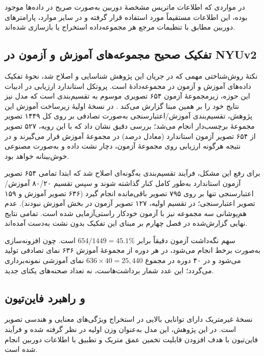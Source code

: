 در مواردی که اطلاعات ماتریس مشخصهٔ دوربین به‌صورت صریح در داده‌ها موجود بوده، این اطلاعات مستقیماً مورد استفاده قرار گرفته و در سایر موارد، پارامترهای دوربین مطابق با تنظیمات مرجع هر مجموعه‌داده استخراج یا بازسازی شده‌اند.

\subsection{تفکیک صحیح مجموعه‌های آموزش و آزمون در NYUv2}

نکتهٔ روش‌شناختی مهمی که در جریان این پژوهش شناسایی و اصلاح شد، نحوهٔ تفکیک داده‌های آموزش و آزمون در مجموعه‌دادهٔ  است. پروتکل استاندارد ارزیابی در ادبیات این حوزه، زیرمجموعهٔ آزمون ۶۵۴ تصویری موسوم به تقسیم‌بندی  است \cite{Eigen2014Depth} که مدل  نیز نتایج خود را بر همین مبنا گزارش می‌کند \cite{DepthAnythingV2}. در نسخهٔ اولیهٔ زیرساخت آموزش این پژوهش، تقسیم‌بندی آموزش/اعتبارسنجی به‌صورت تصادفی بر روی کل ۱۴۴۹ تصویر مجموعهٔ برچسب‌دار انجام می‌شد؛ بررسی دقیق نشان داد که با این رویه، ۵۲۷ تصویر از ۶۵۴ تصویر آزمون استاندارد (معادل  درصد) در مجموعهٔ آموزش قرار می‌گیرند و در نتیجه هرگونه ارزیابی روی مجموعهٔ آزمون، دچار نشت داده و به‌صورت مصنوعی خوش‌بینانه خواهد بود.

برای رفع این مشکل، فرآیند تقسیم‌بندی به‌گونه‌ای اصلاح شد که ابتدا تمامی ۶۵۴ تصویر آزمون استاندارد به‌طور کامل کنار گذاشته شوند و سپس تقسیم ۸۰/۲۰ آموزش/اعتبارسنجی تنها بر روی ۷۹۵ تصویر باقی‌مانده انجام گیرد (۶۳۶ تصویر آموزش و ۱۵۹ تصویر اعتبارسنجی؛ در تقسیم اولیه، ۱۲۷ تصویر آزمون در بخش آموزش نبودند). عدم هم‌پوشانی سه مجموعه نیز با آزمون خودکار راستی‌آزمایی شده است. تمامی نتایج نهایی گزارش‌شده در فصل چهارم بر مبنای این تفکیک بدون نشت به‌دست آمده‌اند.

سهم نگه‌داشت آزمون دقیقاً برابر \(654/1449=45.1\%\) است. چون افزونه‌سازی به‌صورت برخط انجام می‌شود، در هر دوره از مجموعهٔ آموزش ۶۳۶ نمای تصادفی تولید می‌شود و در ۴۰ دوره در مجموع \(636\times40=25{,}440\) نمای آموزشی نمونه‌برداری می‌گردد؛ این عدد شمار برداشت‌هاست، نه تعداد صحنه‌های یکتای جدید.

\subsection{\basemodel{} و راهبرد فاین‌تیون}

نسخهٔ غیرمتریک \basemodel{} دارای توانایی بالایی در استخراج ویژگی‌های معنایی و هندسی تصویر است. در این پژوهش، این مدل به‌عنوان وزن اولیه در نظر گرفته شده و فرآیند فاین‌تیون با هدف افزودن قابلیت تخمین عمق متریک و تطبیق با اطلاعات دوربین انجام شده است.

